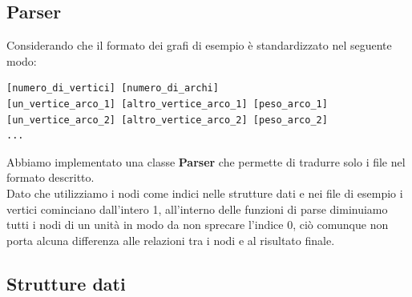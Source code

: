 \documentclass[]{article}
\begin{document}
\subsection{Parser}
Considerando che il formato dei grafi di esempio è standardizzato nel seguente modo:
\begin{verbatim}
[numero_di_vertici] [numero_di_archi] 
[un_vertice_arco_1] [altro_vertice_arco_1] [peso_arco_1] 
[un_vertice_arco_2] [altro_vertice_arco_2] [peso_arco_2] 
...
\end{verbatim}
Abbiamo implementato una classe \textbf{Parser} che permette di tradurre solo i file nel formato descritto.\\
Dato che utilizziamo i nodi come indici nelle strutture dati e nei file di esempio i vertici cominciano dall'intero 1, all'interno delle funzioni di parse diminuiamo tutti i nodi di un unità in modo da non sprecare l'indice 0, ciò comunque non porta alcuna differenza alle relazioni tra i nodi e al risultato finale.
\subsection{Strutture dati}
\end{document}
